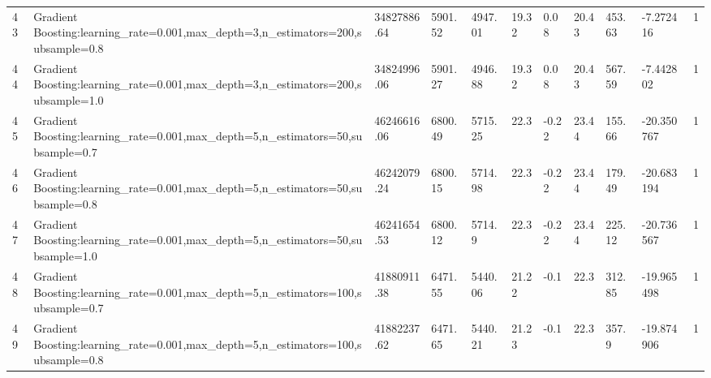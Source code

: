 \begin{longtable}{C{0.8cm} L{2cm} C{1.15cm} C{1.15cm} C{1.15cm} C{1.15cm} C{0.85cm} C{1.25cm} C{1.2cm} C{1.5cm} C{1.0cm}}
43 & Gradient Boosting:\newline learning\_rate=0.001,\newline max\_depth=3,\newline n\_estimators=200,\newline subsample=0.8 & 34827886.64 & 5901.52 & 4947.01 & 19.32 & 0.08 & 20.43 & 453.63 & -7.272416 & 1 \\
44 & Gradient Boosting:\newline learning\_rate=0.001,\newline max\_depth=3,\newline n\_estimators=200,\newline subsample=1.0 & 34824996.06 & 5901.27 & 4946.88 & 19.32 & 0.08 & 20.43 & 567.59 & -7.442802 & 1 \\
45 & Gradient Boosting:\newline learning\_rate=0.001,\newline max\_depth=5,\newline n\_estimators=50,\newline subsample=0.7 & 46246616.06 & 6800.49 & 5715.25 & 22.3 & -0.22 & 23.44 & 155.66 & -20.350767 & 1 \\
46 & Gradient Boosting:\newline learning\_rate=0.001,\newline max\_depth=5,\newline n\_estimators=50,\newline subsample=0.8 & 46242079.24 & 6800.15 & 5714.98 & 22.3 & -0.22 & 23.44 & 179.49 & -20.683194 & 1 \\
47 & Gradient Boosting:\newline learning\_rate=0.001,\newline max\_depth=5,\newline n\_estimators=50,\newline subsample=1.0 & 46241654.53 & 6800.12 & 5714.9 & 22.3 & -0.22 & 23.44 & 225.12 & -20.736567 & 1 \\
48 & Gradient Boosting:\newline learning\_rate=0.001,\newline max\_depth=5,\newline n\_estimators=100,\newline subsample=0.7 & 41880911.38 & 6471.55 & 5440.06 & 21.22 & -0.1 & 22.3 & 312.85 & -19.965498 & 1 \\
49 & Gradient Boosting:\newline learning\_rate=0.001,\newline max\_depth=5,\newline n\_estimators=100,\newline subsample=0.8 & 41882237.62 & 6471.65 & 5440.21 & 21.23 & -0.1 & 22.3 & 357.9 & -19.874906 & 1 \\

\end{longtable}
